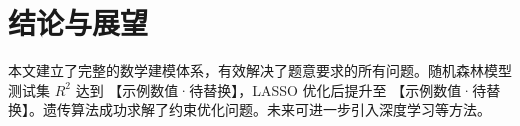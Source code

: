 \section{结论与展望}

本文建立了完整的数学建模体系，有效解决了题意要求的所有问题。随机森林模型测试集 $R^2$ 达到 【示例数值·待替换】，LASSO 优化后提升至 【示例数值·待替换】。遗传算法成功求解了约束优化问题。未来可进一步引入深度学习等方法。
